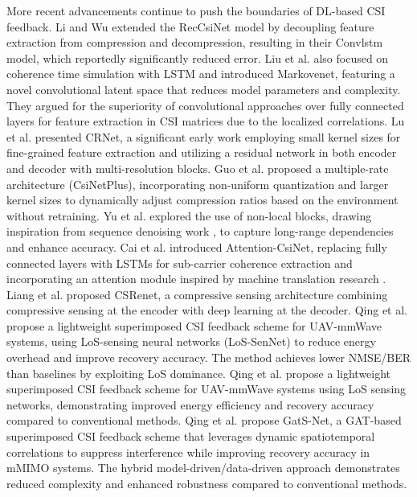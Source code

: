 \documentclass[lettersize,journal]{IEEEtran}
\begin{document}
More recent advancements continue to push the boundaries of DL-based CSI feedback. Li and Wu \cite{abj} extended the RecCsiNet model by decoupling feature extraction from compression and decompression, resulting in their Convlstm model, which reportedly significantly reduced error. Liu et al. \cite{abk} also focused on coherence time simulation with LSTM and introduced Markovenet, featuring a novel convolutional latent space that reduces model parameters and complexity. They argued for the superiority of convolutional approaches over fully connected layers for feature extraction in CSI matrices due to the localized correlations. Lu et al. \cite{abn} presented CRNet, a significant early work employing small kernel sizes for fine-grained feature extraction and utilizing a residual network in both encoder and decoder with multi-resolution blocks. Guo et al. \cite{abo} proposed a multiple-rate architecture (CsiNetPlus), incorporating non-uniform quantization and larger kernel sizes to dynamically adjust compression ratios based on the environment without retraining. Yu et al. \cite{abq} explored the use of non-local blocks, drawing inspiration from sequence denoising work \cite{abr}, to capture long-range dependencies and enhance accuracy. Cai et al. \cite{abs} introduced Attention-CsiNet, replacing fully connected layers with LSTMs for sub-carrier coherence extraction and incorporating an attention module inspired by machine translation research \cite{abt}. Liang et al. \cite{abm} proposed CSRenet, a compressive sensing architecture combining compressive sensing at the encoder with deep learning at the decoder. Qing et al. \cite{qing2023los}  propose a lightweight superimposed CSI feedback scheme for UAV-mmWave systems, using LoS-sensing neural networks (LoS-SenNet) to reduce energy overhead and improve recovery accuracy. The method achieves lower NMSE/BER than baselines by exploiting LoS dominance.
Qing et al. \cite{losfeedback} propose a lightweight superimposed CSI feedback scheme for UAV-mmWave systems using LoS sensing networks, demonstrating improved energy efficiency and recovery accuracy compared to conventional methods.
Qing et al. \cite{gatsnet} propose GatS-Net, a GAT-based superimposed CSI feedback scheme that leverages dynamic spatiotemporal correlations to suppress interference while improving recovery accuracy in mMIMO systems. The hybrid model-driven/data-driven approach demonstrates reduced complexity and enhanced robustness compared to conventional methods.
\end{document}
